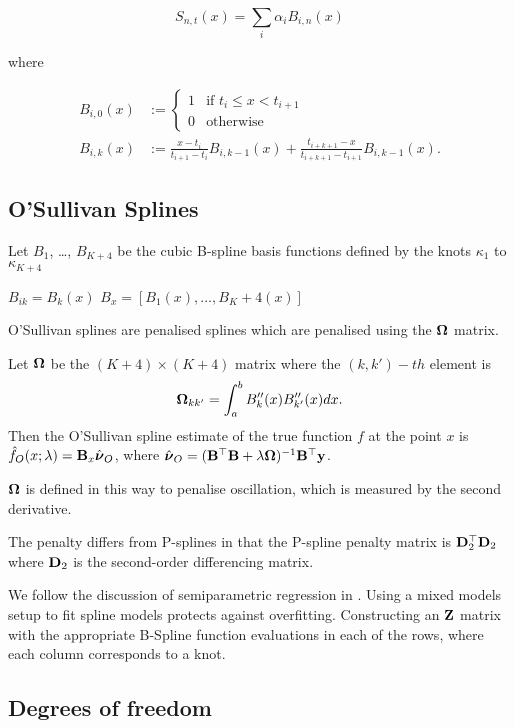\documentclass{amsart}[12pt]
\begin{document}
$$
S_{n, t}(x) = \sum_i \alpha_i B_{i, n}(x)
$$

where

\begin{align*}
B_{i, 0}(x) &:= \begin{cases}
1 & \text{if } t_i \leq x < t_{i+1} \\
0 & \text{otherwise}
\end{cases} \\
B_{i, k}(x) &:= \frac{x - t_i}{t_{i + 1} - t_i} B_{i, k-1} (x) + \frac{t_{i + k + 1} - x}{t_{i + k + 1} - t_{i + 1}} B_{i, k-1} (x).
\end{align*}

\subsection{O'Sullivan Splines}

Let $B_1$, \ldots, $B_{K+4}$ be the cubic B-spline basis functions defined by the knots $\kappa_1$ to
$\kappa_{K+4}$

$B_{ik} = B_k (x)$
$B_x = [B_1(x), \ldots, B_K+4(x)]$

O'Sullivan splines are penalised splines which are penalised using the ${\boldsymbol \Omega}$ matrix.

Let ${\boldsymbol \Omega}$ be the $(K+4) \times (K+4)$ matrix where the $(k, k')-th$ element is
\[
	{\boldsymbol \Omega}_{k k'} = \int_a^b B''_k(x) B''_{k'}(x) dx.
\]
Then the O'Sullivan spline estimate of the true function $f$ at the point $x$ is
$\hat{f}_O(x; \lambda) = {\bf B}_x \hat{{\boldsymbol \nu}}_O$, where
$\hat{{\boldsymbol \nu}}_O = ({\bf B}^\top {\bf B} + \lambda {\boldsymbol\Omega})^{-1} {\bf B}^\top {\bf y}$.

${\boldsymbol \Omega}$ is defined in this way to penalise oscillation, which is measured by the second derivative.

The penalty differs from P-splines in that the P-spline penalty matrix is ${\bf D}_2^\top {\bf D}_2$ where ${\bf D}_2$ is
the second-order differencing matrix.

We follow the discussion of semiparametric regression in \cite{RuppertWandCarroll}.
Using a mixed models setup to fit spline models protects against overfitting.
Constructing an ${\bf Z}$ matrix with the appropriate B-Spline function evaluations in each of the rows, where
each column corresponds to a knot.

\subsection{Degrees of freedom}
\end{document}

